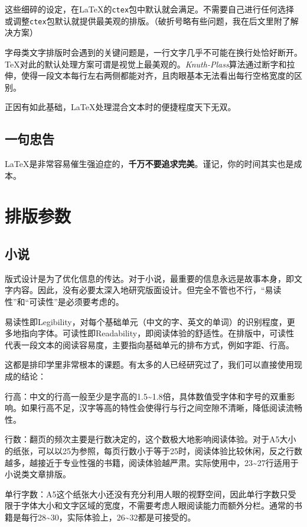 \documentclass[10pt,openany]{book}
\begin{document}
\begin{sloppypar}
    这些细碎的设定，在{\LaTeX}的\texttt{ctex}包中默认就会满足。不需要自己进行任何选择或调整\texttt{ctex}包默认就提供最美观的排版。（破折号略有些问题，我在后文里附了解决方案）

    字母类文字排版时会遇到的关键问题是，一行文字几乎不可能在换行处恰好断开。{\TeX}对此的默认处理方案可谓是视觉上最美观的。\textit{Knuth-Plass}算法通过断字和拉伸，使得一段文本每行左右两侧都能对齐，且肉眼基本无法看出每行空格宽度的区别。

    正因有如此基础，{\LaTeX}处理混合文本时的便捷程度天下无双。

    \section{一句忠告}

     {\LaTeX}是非常容易催生强迫症的，\textbf{千万不要追求完美}。谨记，你的时间其实也是成本。

    \chapter{排版参数}

    \section{小说}

    版式设计是为了优化信息的传达。对于小说，最重要的信息永远是故事本身，即文字内容。因此，没有必要太深入地研究版面设计。但完全不管也不行，“易读性”和“可读性”是必须要考虑的。

    易读性即Legibility，对每个基础单元（中文的字、英文的单词）的识别程度，更多地指向字体。可读性即Readability，即阅读体验的舒适性。在排版中，可读性代表一段文本的阅读容易度，主要指向基础单元的排布方式，例如字距、行高。

    这都是排印学里非常根本的课题。有太多的人已经研究过了，我们可以直接使用现成的结论：

    行高：中文的行高一般至少是字高的1.5\textasciitilde1.8倍，具体数值受字体和字号的双重影响。如果行高不足，汉字等高的特性会使得行与行之间空隙不清晰，降低阅读流畅性。

    行数：翻页的频次主要是行数决定的，这个数极大地影响阅读体验。对于A5大小的纸张，可以以25为参照，每页行数小于等于25时，阅读体验比较休闲，反之行数越多，越接近于专业性强的书籍，阅读体验越严肃。实际使用中，23\textasciitilde27行适用于小说类文章排版。

    单行字数：A5这个纸张大小还没有充分利用人眼的视野空间，因此单行字数只受限于字体大小和文字区域的宽度，不需要考虑人眼阅读能力而额外分栏。通常的书籍是每行28\textasciitilde30，实际体验上，26\textasciitilde32都是可接受的。


\end{sloppypar}
\end{document}
